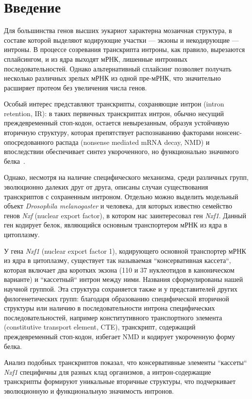 \clearpage
\section{Введение}

Для большинства генов высших эукариот характерна мозаичная структура, в составе которой выделяют кодирующие участки — экзоны и некодирующие — интроны.
В процессе созревания транскрипта интроны, как правило, вырезаются сплайсингом, и из ядра выходят мРНК, лишенные интронных последовательностей.
Однако альтернативный сплайсинг позволяет получать несколько различных зрелых мРНК из одной пре-мРНК, что значительно расширяет протеом без увеличения числа генов.

Особый интерес представляют транскрипты, сохраняющие интрон (intron retention, IR): в таких первичных транскриптах интрон, обычно несущий преждевременный стоп-кодон, остается невырезанным, образуя устойчивую вторичную структуру, которая препятствует распознаванию факторами нонсенс-опосредованного распада (nonsense mediated mRNA decay, NMD) и впоследствии обеспечивает синтез укороченного, но функционально значимого белка~\cite{Mamon2019}.

Однако, несмотря на наличие специфического механизма, среди различных групп, эволюционно далеких друг от друга, описаны случаи существования транскриптов с сохраненным интроном.
Отдельно можно выделить модельный объект \textit{Drosophila melanogaster} и человека, для которых известно семейство генов \textit{Nxf} (nuclear export factor), в котором нас заинтересовал ген \textit{Nxf1}.
Данный ген кодирует белок, являющийся основным транспортером мРНК из ядра в цитоплазму.

У гена \textit{Nxf1} (nuclear export factor 1), кодирующего основной транспортер мРНК из ядра в цитоплазму, существует так называемая ``консервативная кассета``, которая включает два коротких экзона (110 и 37 нуклеотидов в каноническом варианте) и ``кассетный`` интрон между ними.
Названия сформулированы нашей научной группой.
Эта структура сохраняется также и у представителей других филогенетических групп: благодаря образованию специфической вторичной структуры или наличию в последовательности интрона специфических последовательностей, например конститутивного транспортного элемента (constitutive transport element, CTE), транскрипт, содержащий преждевременный стоп-кодон, избегает NMD и кодирует укороченную форму белка.

Анализ подобных транскриптов показал, что консервативные элементы ``кассеты`` \textit{Nxf1} специфичны для разных клад организмов, а интрон-содержащие транскрипты формируют уникальные вторичные структуры, что подчеркивает эволюционную и функциональную значимость интронов.

